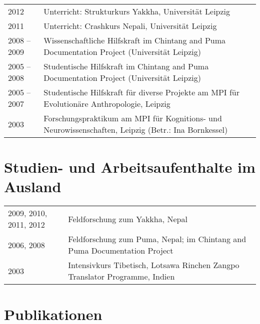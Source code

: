 \begin{tabularx}{\textwidth}{@{}p{9em}X}
2012&		Unterricht: Strukturkurs Yakkha, Universität Leipzig\\
2011& Unterricht: Crashkurs Nepali, Universität Leipzig\\
2008 – 2009&		Wissenschaftliche Hilfskraft im Chintang and Puma Documentation Project (Universität Leipzig)\\
2005 – 2008&	Studentische Hilfskraft im Chintang and Puma Documentation Project (Universität Leipzig)\\
2005 –  2007&		Studentische Hilfskraft für diverse Projekte am MPI für Evolutionäre Anthropologie, Leipzig\\
 2003&			Forschungspraktikum am MPI für Kognitions- und Neurowissenschaften, Leipzig (Betr.: Ina Bornkessel)\\
\end{tabularx}


\section*{Studien- und Arbeitsaufenthalte im Ausland}

\begin{tabularx}{\textwidth}{@{}p{9em}X}
2009, 2010, 2011, 2012&		Feldforschung zum Yakkha, Nepal\\
2006, 2008&					Feldforschung zum Puma, Nepal; im Chintang and Puma Documentation Project \\
2003&						Intensivkurs Tibetisch, Lotsawa Rinchen Zangpo Translator Programme, Indien\\
\end{tabularx}


\section*{Publikationen}

